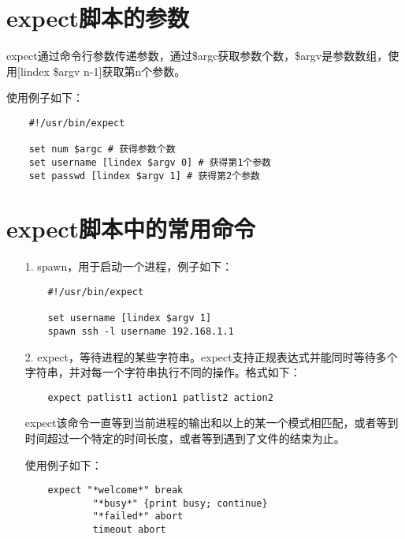 \documentclass[a4paper,left=2.5cm,right=2.5cm,11pt]{article}
\begin{document}
\tableofcontents

\clearpage

\section{expect脚本的参数}
	expect通过命令行参数传递参数，通过\$argc获取参数个数，\$argv是参数数组，使用[lindex \$argv n-1]获取第n个参数。\par

	使用例子如下：
	\begin{lstlisting}
	#!/usr/bin/expect

	set num $argc # 获得参数个数
	set username [lindex $argv 0] # 获得第1个参数
	set passwd [lindex $argv 1] # 获得第2个参数
	\end{lstlisting}

\section{expect脚本中的常用命令}
	\begin{itemize}
		\item[1.] spawn，用于启动一个进程，例子如下：
		\begin{lstlisting}
	#!/usr/bin/expect

	set username [lindex $argv 1]
	spawn ssh -l username 192.168.1.1
		\end{lstlisting}

		\item[2.] expect，等待进程的某些字符串。expect支持正规表达式并能同时等待多个字符串，并对每一个字符串执行不同的操作。格式如下：
		\begin{lstlisting}
	expect patlist1 action1 patlist2 action2
		\end{lstlisting}

		expect该命令一直等到当前进程的输出和以上的某一个模式相匹配，或者等到时间超过一个特定的时间长度，或者等到遇到了文件的结束为止。\par

		使用例子如下：
		\begin{lstlisting}
	expect "*welcome*" break
			"*busy*" {print busy; continue}
			"*failed*" abort
			timeout abort
		\end{lstlisting}

	\end{itemize}
\end{document}
